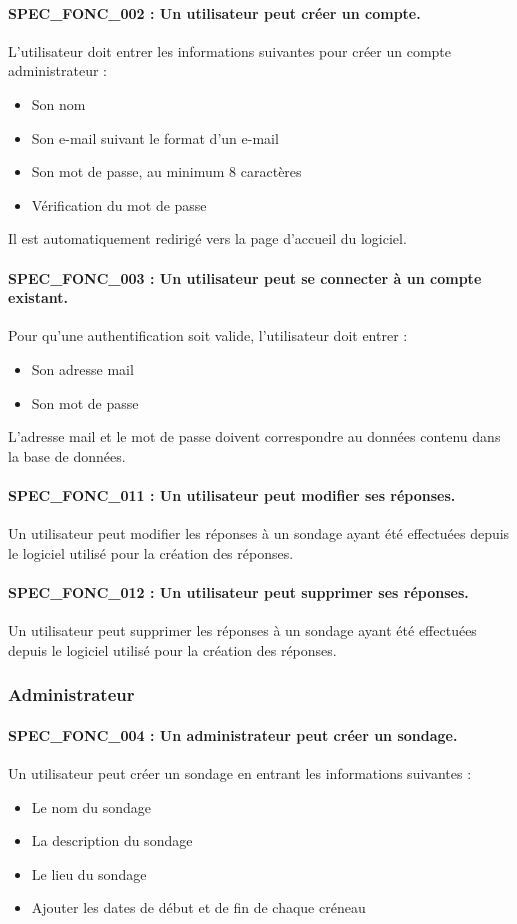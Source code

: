 \documentclass[titlepage]{report}
\begin{document}
\paragraph{SPEC\_FONC\_002 : Un utilisateur peut créer un compte.}
L’utilisateur doit entrer les informations suivantes pour créer un compte administrateur :
\begin{itemize}
\item Son nom
\item Son e-mail suivant le format d’un e-mail
\item Son mot de passe, au minimum 8 caractères
\item Vérification du mot de passe \end{itemize}
Il est automatiquement redirigé vers la page d’accueil du logiciel.

\paragraph{SPEC\_FONC\_003 : Un utilisateur peut se connecter à un compte existant.}
Pour qu’une authentification soit valide, l’utilisateur doit entrer :
\begin{itemize}
\item Son adresse mail
\item Son mot de passe \end{itemize}
L’adresse mail et le mot de passe doivent correspondre au données contenu dans la base de données.

\paragraph{SPEC\_FONC\_011 : Un utilisateur peut modifier ses réponses.}
Un utilisateur peut modifier les réponses à un sondage ayant été effectuées depuis le logiciel utilisé pour la création des réponses.

\paragraph{SPEC\_FONC\_012 : Un utilisateur peut supprimer ses réponses.}
Un utilisateur peut supprimer les réponses à un sondage ayant été effectuées depuis le logiciel utilisé pour la création des réponses.

\subsubsection{Administrateur}

\paragraph{SPEC\_FONC\_004 : Un administrateur peut créer un sondage.}
Un utilisateur peut créer un sondage en entrant les informations suivantes :
\begin{itemize}
\item Le nom du sondage 
\item La description du sondage
\item Le lieu du sondage
\item Ajouter les dates de début et de fin de chaque créneau  \end{itemize}
\end{document}
